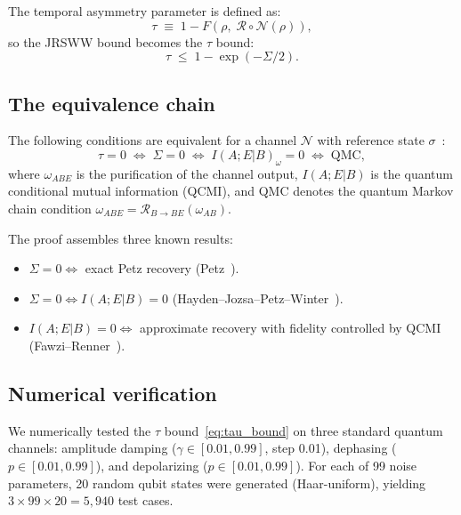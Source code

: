 \documentclass[prl,twocolumn,superscriptaddress,longbibliography,floatfix]{revtex4-2}
\newcommand{\Petz}{\mathcal{R}}
\newcommand{\chan}{\mathcal{N}}
\newcommand{\tauasym}{\tau}
\begin{document}
The temporal asymmetry parameter is defined as:
\begin{equation}
\tauasym \;\equiv\; 1 - F(\rho,\;\Petz\circ\chan(\rho)),
\label{eq:tau_def}
\end{equation}
so the JRSWW bound becomes the $\tauasym$ bound:
\begin{equation}
\tauasym \;\leq\; 1 - \exp(-\Sigma/2).
\label{eq:tau_bound}
\end{equation}

\subsection{The equivalence chain}

The following conditions are equivalent for a channel $\chan$
with reference state $\sigma$~\cite{Petz1988,FawziRenner2015,HJPW2004}:
\begin{equation}
\tauasym = 0
\;\Longleftrightarrow\;
\Sigma = 0
\;\Longleftrightarrow\;
I(A;E|B)_\omega = 0
\;\Longleftrightarrow\;
\text{QMC},
\label{eq:equiv_chain}
\end{equation}
where $\omega_{ABE}$ is the purification of the channel output,
$I(A;E|B)$ is the quantum conditional mutual information
(QCMI), and QMC denotes the quantum Markov chain condition
$\omega_{ABE} = \Petz_{B\to BE}(\omega_{AB})$.

The proof assembles three known results:
\begin{itemize}
\item $\Sigma = 0 \Leftrightarrow$ exact Petz recovery
(Petz~\cite{Petz1988}).
\item $\Sigma = 0 \Leftrightarrow I(A;E|B)=0$
(Hayden--Jozsa--Petz--Winter~\cite{HJPW2004}).
\item $I(A;E|B) = 0 \Leftrightarrow$ approximate recovery with
fidelity controlled by QCMI
(Fawzi--Renner~\cite{FawziRenner2015}).
\end{itemize}

\subsection{Numerical verification}

We numerically tested the $\tauasym$ bound~\eqref{eq:tau_bound}
on three standard quantum channels: amplitude damping
($\gamma \in [0.01, 0.99]$, step 0.01), dephasing
($p \in [0.01, 0.99]$), and depolarizing
($p \in [0.01, 0.99]$). For each of 99 noise
parameters, 20 random qubit states were generated (Haar-uniform),
yielding $3 \times 99 \times 20 = 5{,}940$ test cases.
\end{document}
